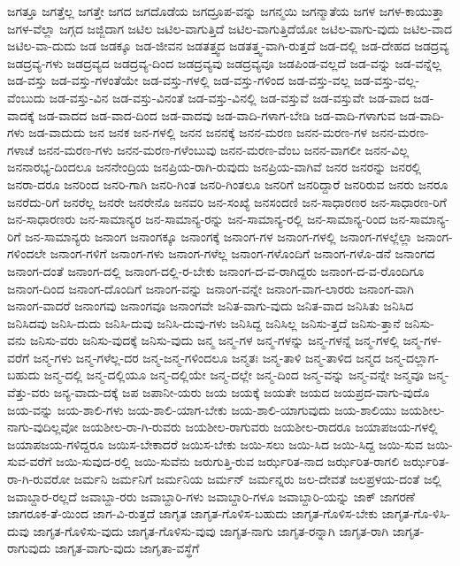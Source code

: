 {ಜಗತ್ತೂ
ಜಗತ್ತೆಲ್ಲ
ಜಗತ್ತೇ
ಜಗದ
ಜಗದೊಡೆಯ
ಜಗದ್ರೂಪ-ವನ್ನು
ಜಗನ್ಮಯಿ
ಜಗನ್ಮಾತೆಯ
ಜಗಳ
ಜಗಳ-ಕಾಯುತ್ತಾ
ಜಗಳ-ವೆಲ್ಲಾ
ಜಗ್ಗದ
ಜಜ್ಜಿದಾಗ
ಜಟಿಲ
ಜಟಿಲ-ವಾಗುತ್ತಿದೆ
ಜಟಿಲ-ವಾಗುತ್ತಿದೆಯೋ
ಜಟಿಲ-ವಾಗು-ವುದು
ಜಟಿಲ-ವಾದ
ಜಟಿಲ-ವಾ-ದುದು
ಜಡ
ಜಡಕ್ಕೂ
ಜಡ-ಜೀವನ
ಜಡತತ್ತ್ವದ
ಜಡತತ್ತ್ವ-ವಾಗಿ-ರುತ್ತದೆ
ಜಡ-ದಲ್ಲಿ
ಜಡ-ದೇಹದ
ಜಡದ್ರವ್ಯ
ಜಡದ್ರವ್ಯ-ಗಳು
ಜಡದ್ರವ್ಯದ
ಜಡದ್ರವ್ಯ-ದಿಂದ
ಜಡದ್ರವ್ಯವು
ಜಡದ್ರವ್ಯವೂ
ಜಡಪಿಂಡ-ವಲ್ಲದೆ
ಜಡ-ವನ್ನು
ಜಡ-ವನ್ನೆಲ್ಲ
ಜಡ-ವಸ್ತು
ಜಡ-ವಸ್ತು-ಗಳಂತೆಯೇ
ಜಡ-ವಸ್ತು-ಗಳಲ್ಲಿ
ಜಡ-ವಸ್ತು-ಗಳಿಂದ
ಜಡ-ವಸ್ತು-ವಲ್ಲ
ಜಡ-ವಸ್ತು-ವಲ್ಲ-ವೆಂಬುದು
ಜಡ-ವಸ್ತು-ವಿನ
ಜಡ-ವಸ್ತು-ವಿನಂತೆ
ಜಡ-ವಸ್ತು-ವಿನಲ್ಲಿ
ಜಡ-ವಸ್ತುವೆ
ಜಡ-ವಸ್ತುವೇ
ಜಡ-ವಾದ
ಜಡ-ವಾದಕ್ಕೆ
ಜಡ-ವಾದದ
ಜಡ-ವಾದ-ದಿಂದ
ಜಡ-ವಾದವು
ಜಡ-ವಾದಿ-ಗಳಾಗ-ಬೇಡಿ
ಜಡ-ವಾದಿ-ಗಳಾಗುವ
ಜಡ-ವಾದಿ-ಗಳು
ಜಡ-ವಾದುದು
ಜನ
ಜನಕ
ಜನ-ಗಳಲ್ಲಿ
ಜನನ
ಜನನಕ್ಕೆ
ಜನನ-ಮರಣ
ಜನನ-ಮರಣ-ಗಳ
ಜನನ-ಮರಣ-ಗಳಾಚೆ
ಜನನ-ಮರಣ-ಗಳು
ಜನನ-ಮರಣ-ಗಳೆಂಬುವು
ಜನನ-ಮರಣ-ವೆಂಬ
ಜನನ-ವಾಗಲೀ
ಜನನ-ವಿಲ್ಲ
ಜನನಾರಭ್ಯ-ದಿಂದಲೂ
ಜನನೇಂದ್ರಿಯ
ಜನಪ್ರಿಯ-ರಾಗಿ-ರುವುದು
ಜನಪ್ರಿಯ-ವಾಗಿವೆ
ಜನರ
ಜನರನ್ನು
ಜನರಲ್ಲಿ
ಜನರಾ-ದರೂ
ಜನರಿಂದ
ಜನರಿ-ಗಾಗಿ
ಜನರಿ-ಗಿಂತ
ಜನರಿ-ಗಿಂತಲೂ
ಜನರಿಗೆ
ಜನರಿದ್ದಾರೆ
ಜನರಿರುವ
ಜನರು
ಜನರೂ
ಜನರೆದು-ರಿಗೆ
ಜನರೆಲ್ಲ
ಜನರೇ
ಜನರೇನೊ
ಜನವರಿ
ಜನ-ಸಂಖ್ಯೆ
ಜನಸಂದಣಿ
ಜನ-ಸಾಧಾರಣರ
ಜನ-ಸಾಧಾರಣ-ರಿಗೆ
ಜನ-ಸಾಧಾರಣರು
ಜನ-ಸಾಮಾನ್ಯರ
ಜನ-ಸಾಮಾನ್ಯ-ರನ್ನು
ಜನ-ಸಾಮಾನ್ಯ-ರಲ್ಲಿ
ಜನ-ಸಾಮಾನ್ಯ-ರಿಂದ
ಜನ-ಸಾಮಾನ್ಯ-ರಿಗೆ
ಜನ-ಸಾಮಾನ್ಯರು
ಜನಾಂಗ
ಜನಾಂಗಕ್ಕೂ
ಜನಾಂಗಕ್ಕೆ
ಜನಾಂಗ-ಗಳ
ಜನಾಂಗ-ಗಳಲ್ಲಿ
ಜನಾಂಗ-ಗಳಲ್ಲೆಲ್ಲಾ
ಜನಾಂಗ-ಗಳಿಂದಲೇ
ಜನಾಂಗ-ಗಳಿಗೆ
ಜನಾಂಗ-ಗಳು
ಜನಾಂಗ-ಗಳೆಲ್ಲ
ಜನಾಂಗ-ಗಳೊಂದಿಗೆ
ಜನಾಂಗ-ಗಳೊ-ಡನೆ
ಜನಾಂಗದ
ಜನಾಂಗ-ದಂತೆ
ಜನಾಂಗ-ದಲ್ಲಿ
ಜನಾಂಗ-ದಲ್ಲಿ-ರ-ಬೇಕು
ಜನಾಂಗ-ದ-ವ-ರಾಗಿದ್ದರು
ಜನಾಂಗ-ದ-ವ-ರೊಂದಿಗೂ
ಜನಾಂಗ-ದಿಂದ
ಜನಾಂಗ-ದೊಂದಿಗೆ
ಜನಾಂಗ-ವನ್ನು
ಜನಾಂಗ-ವನ್ನೇ
ಜನಾಂಗ-ವಾಗ-ಲಾರರು
ಜನಾಂಗ-ವಾಗಿ
ಜನಾಂಗ-ವಾದರೆ
ಜನಾಂಗವು
ಜನಾಂಗವೂ
ಜನಾಂಗವೇ
ಜನಿತ-ವಾಗು-ವುದು
ಜನಿತ-ವಾದ
ಜನಿಸಿತು
ಜನಿಸಿದ
ಜನಿಸಿದವು
ಜನಿಸಿ-ದುದು
ಜನಿಸಿ-ದುವು
ಜನಿಸಿ-ದುವು-ಗಳು
ಜನಿಸಿದ್ದ
ಜನಿಸಿಲ್ಲ
ಜನಿಸು-ತ್ತದೆ
ಜನಿಸು-ತ್ತಾನೆ
ಜನಿಸು-ವನು
ಜನಿಸು-ವರು
ಜನಿಸು-ವುದಕ್ಕೆ
ಜನಿಸು-ವುದು
ಜನ್ಮ
ಜನ್ಮ-ಗಳ
ಜನ್ಮ-ಗಳನ್ನು
ಜನ್ಮ-ಗಳನ್ನೆ
ಜನ್ಮ-ಗಳಲ್ಲಿ
ಜನ್ಮ-ಗಳ-ವರೆಗೆ
ಜನ್ಮ-ಗಳು
ಜನ್ಮ-ಗಳೆಲ್ಲ-ದರ
ಜನ್ಮ-ಜನ್ಮ-ಗಳಿಂದಲೂ
ಜನ್ಮತಃ
ಜನ್ಮ-ತಾಳಿ
ಜನ್ಮ-ತಾಳಿದ
ಜನ್ಮದ
ಜನ್ಮ-ದಲ್ಲಾಗ-ಬಹುದು
ಜನ್ಮ-ದಲ್ಲಿ
ಜನ್ಮ-ದಲ್ಲಿಯೂ
ಜನ್ಮ-ದಲ್ಲಿಯೇ
ಜನ್ಮ-ದಲ್ಲೇ
ಜನ್ಮ-ದಿಂದ
ಜನ್ಮ-ವನ್ನು
ಜನ್ಮ-ವನ್ನೇ
ಜನ್ಮವೂ
ಜನ್ಮ-ವೆತ್ತು-ವರು
ಜನ್ಯ-ವಾದು-ದಕ್ಕೆ
ಜಪ
ಜಪಾನೀ-ಯರು
ಜಯ
ಜಯಕ್ಕೆ
ಜಯತೇ
ಜಯದ
ಜಯಪ್ರದ-ವಾಗು-ವುದೊ
ಜಯ-ವನ್ನು
ಜಯ-ಶಾಲಿ-ಗಳು
ಜಯ-ಶಾಲಿ-ಯಾಗ-ಬೇಕು
ಜಯ-ಶಾಲಿ-ಯಾಗುವುದು
ಜಯ-ಶಾಲಿಯು
ಜಯಶೀಲ-ನಾಗು-ವುದಿಲ್ಲವೋ
ಜಯಶೀಲ-ರಾ-ಗಿ-ರುವರು
ಜಯಶೀಲ-ರಾಗುವರು
ಜಯಶೀಲ-ರಾದರೂ
ಜಯಾಪಜಯ-ಗಳಲ್ಲಿ
ಜಯಾಪಜಯ-ಗಳಿದ್ದರೂ
ಜಯಿಸ-ಬೇಕಾದರೆ
ಜಯಿಸ-ಬೇಕು
ಜಯಿ-ಸಲು
ಜಯಿ-ಸಿದ
ಜಯಿ-ಸಿದ್ದ
ಜಯಿ-ಸುವ
ಜಯಿ-ಸುವ-ವರೆಗೆ
ಜಯಿ-ಸುವುದ-ರಲ್ಲಿ
ಜಯಿ-ಸುವೆನು
ಜರುಗುತ್ತಿ-ರುವ
ಜರ್ಝರಿತ-ನಾದ
ಜರ್ಝರಿತ-ರಾಗಲಿ
ಜರ್ಝರಿತ-ರಾ-ಗಿ-ರುವರೋ
ಜರ್ಮನಿ
ಜರ್ಮನಿಗೆ
ಜರ್ಮನಿಯ
ಜರ್ಮನ್
ಜರ್ಮನ್ನರು
ಜಲ-ದೇವತೆ
ಜಲಪ್ರಳಯ-ದಂತೆ
ಜಲ್ಲಿ
ಜವಾಬ್ದಾರ-ರಲ್ಲದೆ
ಜವಾಬ್ದಾ-ರರು
ಜವಾಬ್ದಾರಿ-ಗಳು
ಜವಾಬ್ದಾರಿ-ಗಳೂ
ಜವಾಬ್ದಾರಿ-ಯನ್ನು
ಜಾಕ್
ಜಾಗರಣೆ
ಜಾಗರೂಕ-ತೆ-ಯಿಂದ
ಜಾಗ-ವಿ-ರುತ್ತದೆ
ಜಾಗೃತ
ಜಾಗೃತ-ಗೊಳಿಸ-ಬಹುದು
ಜಾಗೃತ-ಗೊಳಿಸ-ಬೇಕು
ಜಾಗೃತ-ಗೊ-ಳಿಸಿ-ದುವು
ಜಾಗೃತ-ಗೊಳಿಸು-ವುದು
ಜಾಗೃತ-ಗೊಳಿಸು-ವುವು
ಜಾಗೃತ-ನಾಗು
ಜಾಗೃತ-ರನ್ನಾಗಿ
ಜಾಗೃತ-ರಾಗಿ
ಜಾಗೃತ-ರಾಗುವುದು
ಜಾಗೃತ-ವಾಗು-ವುದು
ಜಾಗೃತಾ-ವಸ್ಥೆಗೆ
}
